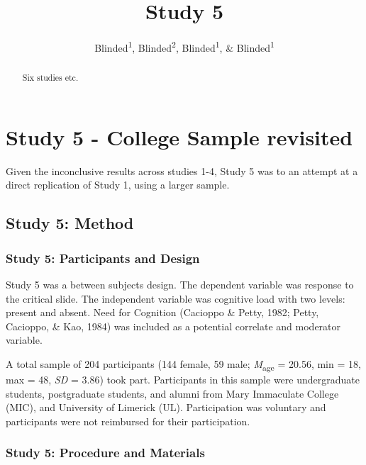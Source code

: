 \documentclass[
  american,
  man,floatsintext]{apa7}
\title{Study 5}
\author{Blinded\textsuperscript{1}, Blinded\textsuperscript{2}, Blinded\textsuperscript{1}, \& Blinded\textsuperscript{1}}
\date{}
\begin{document}
\maketitle
\begin{abstract}
Six studies etc.
\end{abstract}

\hypertarget{study-5---college-sample-revisited}{%
\section{Study 5 - College Sample revisited}\label{study-5---college-sample-revisited}}

Given the inconclusive results across studies 1-4, Study 5 was to an attempt at a direct replication of Study 1, using a larger sample.

\hypertarget{study-5-method}{%
\subsection{Study 5: Method}\label{study-5-method}}

\hypertarget{study-5-participants-and-design}{%
\subsubsection{Study 5: Participants and Design}\label{study-5-participants-and-design}}

Study 5 was a between subjects design. The dependent variable was response to the critical slide. The independent variable was cognitive load with two levels: present and absent. Need for Cognition (Cacioppo \& Petty, 1982; Petty, Cacioppo, \& Kao, 1984) was included as a potential correlate and moderator variable.

A total sample of 204 participants (144 female, 59 male; \emph{M}\textsubscript{age} = 20.56, min = 18, max = 48, \emph{SD} = 3.86) took part. Participants in this sample were undergraduate students, postgraduate students, and alumni from Mary Immaculate College (MIC), and University of Limerick (UL). Participation was voluntary and participants were not reimbursed for their participation.

\hypertarget{study-5-procedure-and-materials}{%
\subsubsection{Study 5: Procedure and Materials}\label{study-5-procedure-and-materials}}
\end{document}
